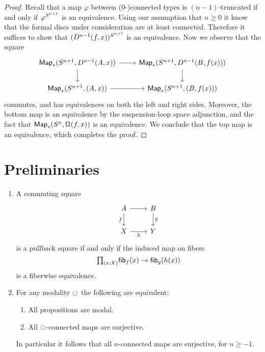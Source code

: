 \documentclass[9pt,twosided]{amsart}
\begin{document}
\begin{proof}
  Recall that a map $\varphi$ between ($0$-)connected types is $(n-1)$-truncated if and only if $\varphi^{S^{n+1}}$ is an equivalence. Using our assumption that $n\geq 0$ it know that the formal discs under consideration are at least connected. Therefore it suffices to show that $(D^{n-1}(f,x))^{S^{n+1}}$ is an equivalence. Now we observe that the square
  \begin{equation*}
    \begin{tikzcd}
      \mathsf{Map}_\ast(\sphere{n+1},D^{n-1}(A,x)) \arrow[r] \arrow[d] & \mathsf{Map}_\ast(\sphere{n+1},D^{n-1}(B,f(x))) \arrow[d] \\
      \mathsf{Map}_\ast(\sphere{n+1},(A,x)) \arrow[r] & \mathsf{Map}_\ast(\sphere{n+1},(B,f(x)))
    \end{tikzcd}
  \end{equation*}
  commutes, and has equivalences on both the left and right sides. Moreover, the bottom map is an equivalence by the suspension-loop space adjunction, and the fact that $\mathsf{Map}_\ast(S^{n},\mathsf{\Omega}^{}(f,x))$ is an equivalence. We conclude that the top map is an equivalence, which completes the proof.
\end{proof}



\section{Preliminaries}
\begin{enumerate}
\item A commuting square
\begin{equation*}
\begin{tikzcd}
A \arrow[d,swap,"f"] \arrow[r] & B \arrow[d,"g"] \\
X \arrow[r,swap,"h"] & Y
\end{tikzcd}
\end{equation*}
is a pullback square if and only if the induced map on fibers
\begin{equation*}
\prd{x:X}\fib{f}{x}\to\fib{g}{h(x)}
\end{equation*}
is a fiberwise equivalence.
\item For any modality ${\ocircle}$ the following are equivalent:
\begin{enumerate}
\item All propositions are modal.
\item All ${\ocircle}$-connected maps are surjective.
\end{enumerate}
In particular it follows that all $n$-connected maps are surjective, for $n\geq -1$.
\end{enumerate}
\end{document}
